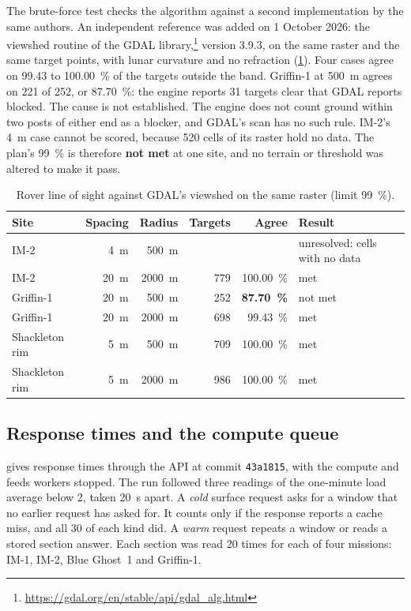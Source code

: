 \documentclass[11pt,a4paper]{article}
\newcommand{\pwcommit}{\texttt{43a1815}}
\begin{document}
The brute-force test checks the algorithm against a second implementation by the same
authors. An independent reference was added on 1 October 2026: the viewshed routine of the GDAL
library,\footnote{\url{https://gdal.org/en/stable/api/gdal_alg.html}} version 3.9.3, on the same
raster and the same target points, with lunar curvature and no refraction
(\cref{tab:gdal}). Four cases agree on 99.43 to \qty{100.00}{\percent} of the targets outside the
band. Griffin-1 at \qty{500}{\m} agrees on 221 of 252, or \qty{87.70}{\percent}: the engine
reports 31 targets clear that GDAL reports blocked. The cause is not established. The engine
does not count ground within two posts of either end as a blocker, and GDAL's scan has no such
rule. IM-2's \qty{4}{\m} case cannot be scored, because 520 cells of its raster hold no data.
The plan's \qty{99}{\percent} is therefore \textbf{not met} at one site, and no terrain or
threshold was altered to make it pass.

\begin{table}[htbp]
\centering\small
\caption{Rover line of sight against GDAL's viewshed on the same raster (limit \qty{99}{\percent}).}
\label{tab:gdal}
\begin{tabular}{@{}lrrrrl@{}}
\toprule
Site & Spacing & Radius & Targets & Agree & Result \\
\midrule
IM-2 & \qty{4}{\m} & \qty{500}{\m} & & & unresolved: cells with no data \\
IM-2 & \qty{20}{\m} & \qty{2000}{\m} & 779 & \qty{100.00}{\percent} & met \\
Griffin-1 & \qty{20}{\m} & \qty{500}{\m} & 252 & \textbf{\qty{87.70}{\percent}} & not met \\
Griffin-1 & \qty{20}{\m} & \qty{2000}{\m} & 698 & \qty{99.43}{\percent} & met \\
Shackleton rim & \qty{5}{\m} & \qty{500}{\m} & 709 & \qty{100.00}{\percent} & met \\
Shackleton rim & \qty{5}{\m} & \qty{2000}{\m} & 986 & \qty{100.00}{\percent} & met \\
\bottomrule
\end{tabular}
\end{table}

\subsection{Response times and the compute queue}
\label{sec:perf}

 gives response times through the API at commit \pwcommit{}, with the
compute and feeds workers stopped. The run followed three readings of the one-minute load
average below 2, taken \qty{20}{\s} apart. A \emph{cold} surface request asks for a window
that no earlier request has asked for. It counts only if the response reports a cache
miss, and all 30 of each kind did. A \emph{warm} request repeats a window or reads a stored
section answer. Each section was read 20 times for each of four missions: IM-1, IM-2, Blue
Ghost~1 and Griffin-1.
\end{document}
